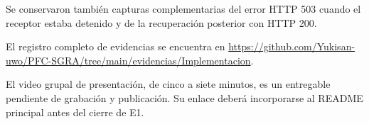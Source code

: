 Se conservaron también capturas complementarias del error HTTP 503 cuando el receptor estaba detenido y de la recuperación posterior con HTTP 200.

El registro completo de evidencias se encuentra en
\url{https://github.com/Yukisan-uwo/PFC-SGRA/tree/main/evidencias/Implementacion}.

El video grupal de presentación, de cinco a siete minutos, es un entregable pendiente de grabación y publicación. Su enlace deberá incorporarse al README principal antes del cierre de E1.
